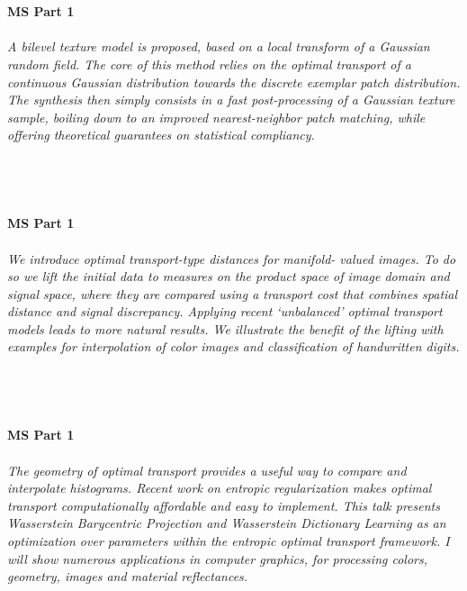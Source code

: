 \begin{multicols}{2}
    \\\\
    \noindent\textbf{MS Part 1}\\
\\  
    \textit{A bilevel texture model is proposed, based on a local transform of a Gaussian random field. The core of this method relies on the optimal transport of a continuous Gaussian distribution towards the discrete exemplar patch distribution. The synthesis then simply consists in a fast post-processing of a Gaussian texture sample, boiling down to an improved nearest-neighbor patch matching, while offering theoretical guarantees on statistical compliancy. }\\
\\ 
    \\
    \\\\
    \noindent\textbf{MS Part 1}\\
\\  
    \textit{We introduce optimal transport-type distances for manifold-
valued images. To do so we lift the initial data to measures on the product space of image domain and signal space, where they are compared using a transport cost that combines spatial distance and signal discrepancy. Applying recent ‘unbalanced’ optimal transport models leads to more natural results. We illustrate the benefit of the lifting with examples for interpolation of color images and classification of handwritten digits.
}\\
\\ 
    \\
    \\\\
    \noindent\textbf{MS Part 1}\\
\\  
    \textit{The geometry of optimal transport provides a useful way to compare and interpolate histograms. Recent work on entropic regularization makes optimal transport computationally affordable and easy to implement. This talk presents Wasserstein Barycentric Projection and Wasserstein Dictionary Learning as an optimization over parameters within the entropic optimal transport framework. I will show numerous applications in computer graphics, for processing colors, geometry, images and material reflectances.}\\
\\ 

\end{multicols}

